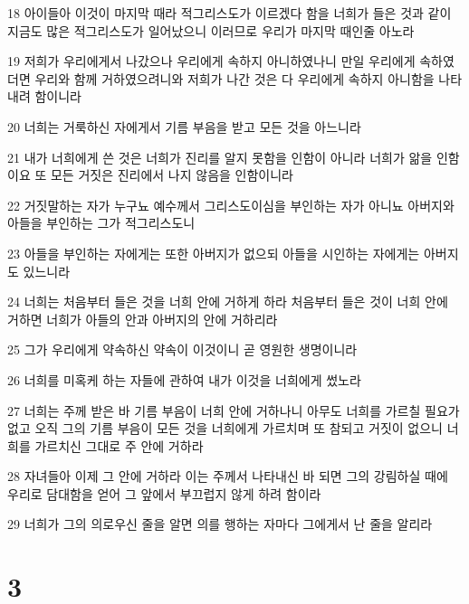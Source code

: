 \par 18 아이들아 이것이 마지막 때라 적그리스도가 이르겠다 함을 너희가 들은 것과 같이 지금도 많은 적그리스도가 일어났으니 이러므로 우리가 마지막 때인줄 아노라
\par 19 저희가 우리에게서 나갔으나 우리에게 속하지 아니하였나니 만일 우리에게 속하였더면 우리와 함께 거하였으려니와 저희가 나간 것은 다 우리에게 속하지 아니함을 나타내려 함이니라
\par 20 너희는 거룩하신 자에게서 기름 부음을 받고 모든 것을 아느니라
\par 21 내가 너희에게 쓴 것은 너희가 진리를 알지 못함을 인함이 아니라 너희가 앎을 인함이요 또 모든 거짓은 진리에서 나지 않음을 인함이니라
\par 22 거짓말하는 자가 누구뇨 예수께서 그리스도이심을 부인하는 자가 아니뇨 아버지와 아들을 부인하는 그가 적그리스도니
\par 23 아들을 부인하는 자에게는 또한 아버지가 없으되 아들을 시인하는 자에게는 아버지도 있느니라
\par 24 너희는 처음부터 들은 것을 너희 안에 거하게 하라 처음부터 들은 것이 너희 안에 거하면 너희가 아들의 안과 아버지의 안에 거하리라
\par 25 그가 우리에게 약속하신 약속이 이것이니 곧 영원한 생명이니라
\par 26 너희를 미혹케 하는 자들에 관하여 내가 이것을 너희에게 썼노라
\par 27 너희는 주께 받은 바 기름 부음이 너희 안에 거하나니 아무도 너희를 가르칠 필요가 없고 오직 그의 기름 부음이 모든 것을 너희에게 가르치며 또 참되고 거짓이 없으니 너희를 가르치신 그대로 주 안에 거하라
\par 28 자녀들아 이제 그 안에 거하라 이는 주께서 나타내신 바 되면 그의 강림하실 때에 우리로 담대함을 얻어 그 앞에서 부끄럽지 않게 하려 함이라
\par 29 너희가 그의 의로우신 줄을 알면 의를 행하는 자마다 그에게서 난 줄을 알리라

\chapter{3}

